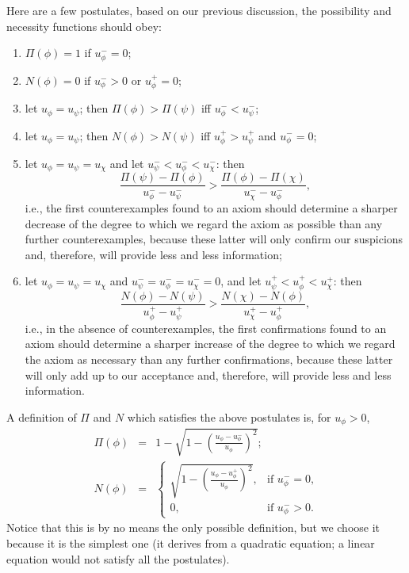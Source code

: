\documentclass[conference]{IEEEtran}
\begin{document}
Here are a few postulates, based on our previous discussion, the possibility
and necessity functions should obey:
\begin{enumerate}
\item $\Pi(\phi) = 1$ if $u_\phi^- = 0$;
\item $N(\phi) = 0$ if $u_\phi^- > 0$ or $u_\phi^+ = 0$;
\item let $u_\phi = u_\psi$; then $\Pi(\phi) > \Pi(\psi)$ iff $u_\phi^- < u_\psi^-$;
\item let $u_\phi = u_\psi$; then $N(\phi) > N(\psi)$ iff $u_\phi^+ > u_\psi^+$ and $u_\phi^- = 0$;
\item let $u_\phi = u_\psi = u_\chi$ and let $u_\psi^- < u_\phi^- < u_\chi^-$: then
  \[
    \frac{\Pi(\psi) - \Pi(\phi)}{u_\phi^- - u_\psi^-} > \frac{\Pi(\phi) - \Pi(\chi)}{u_\chi^- - u_\phi^-},
  \]
  i.e., the first counterexamples found to an axiom should determine a sharper decrease
  of the degree to which we regard the axiom as possible than any further counterexamples,
  because these latter will only confirm our suspicions and, therefore, will provide
  less and less information;
\item let $u_\phi = u_\psi = u_\chi$ and $u_\psi^- = u_\phi^- = u_\chi^- = 0$,
  and let $u_\psi^+ < u_\phi^+ < u_\chi^+$: then
  \[
    \frac{N(\phi) - N(\psi)}{u_\phi^+ - u_\psi^+} > \frac{N(\chi) - N(\phi)}{u_\chi^+ - u_\phi^+},
  \]
  i.e., in the absence of counterexamples,
  the first confirmations found to an axiom should determine a sharper increase
  of the degree to which we regard the axiom as necessary than any further confirmations,
  because these latter will only add up to our acceptance and, therefore, will provide
  less and less information.%
\end{enumerate}

A definition of $\Pi$ and $N$ which satisfies the above postulates is, for $u_\phi > 0$,
\begin{eqnarray}
  \Pi(\phi) &=& 1 - \sqrt{1 - \left(\frac{u_\phi - u_\phi^-}{u_\phi}\right)^2}; \\
  N(\phi) &=& \left\{\begin{array}{cl}
    \sqrt{1 - \left(\frac{u_\phi - u_\phi^+}{u_\phi}\right)^2}, & \mbox{if $u_\phi^- = 0$,}\\
    0, & \mbox{if $u_\phi^- > 0$.}
  \end{array}\right.
\end{eqnarray}
Notice that this is by no means the only possible definition, but we choose it because
it is the simplest one (it derives from a quadratic equation; a linear equation would
not satisfy all the postulates).
\end{document}
